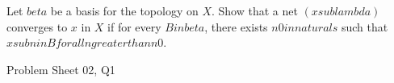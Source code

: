 \begin{samepage}
\begin{ex}
    Let $beta$ be a basis for the topology on $X$. Show that a net $(x sub lambda)$ converges to $x$ in $X$ if for every $B in beta$, there exists $n0 in naturals$ such that $x sub n in B for all n greater than n0$.
\end{ex}
\begin{source}
Problem Sheet 02, Q1
\end{source}
\end{samepage}
